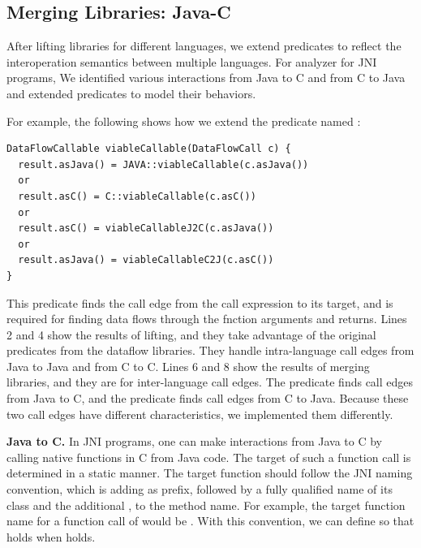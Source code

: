\subsection{Merging Libraries: Java-C}\label{sec:merging}
After lifting libraries for different languages, we extend predicates to
reflect the interoperation semantics between multiple languages.
For analyzer for JNI programs, We identified various interactions from Java to C and from C to Java
and extended predicates to model their behaviors.

For example, the following shows how we extend the predicate
named :
\begin{lstlisting}[style=codeql,xleftmargin=2.5em]
DataFlowCallable viableCallable(DataFlowCall c) {
  result.asJava() = JAVA::viableCallable(c.asJava())
  or
  result.asC() = C::viableCallable(c.asC())
  or
  result.asC() = viableCallableJ2C(c.asJava())
  or
  result.asJava() = viableCallableC2J(c.asC())
}
\end{lstlisting}
This predicate finds the call edge from the call expression to its
target, and is required for finding data flows through the fnction arguments and returns.
Lines 2 and 4 show the results of lifting, and they take advantage of the
original predicates from the dataflow libraries.  They handle
intra-language call edges from Java to Java and from C to C.
Lines 6 and 8 show the results of merging libraries, and they are
for inter-language call edges.  The predicate  finds call edges
from Java to C, and the predicate  finds call edges from
C to Java. Because these two call edges have different characteristics, we
implemented them differently.

\textbf{Java to C.} In JNI programs, one can make interactions from
Java to C by calling native functions in C from Java code. The target
of such a function call is determined in a static manner.
The target function should follow the JNI naming convention, which is adding
 as prefix, 
followed by a fully qualified name of its class and the additional \codeql{\_}, to the method name.
For example, the target function name for a function call of
 would be .
With this convention, we can define 
so that  holds when
 holds.


